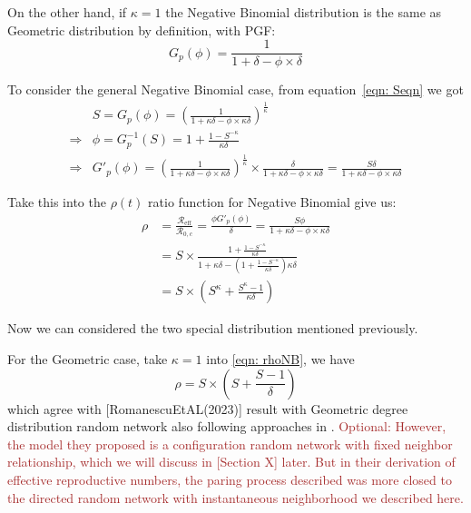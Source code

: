 \documentclass[12pt]{article}
\theoremstyle{plain}
\theoremstyle{definition}
\begin{document}
On the other hand, if $\kappa=1$ the Negative Binomial distribution is the same as Geometric distribution by definition, with PGF: 
\begin{equation}
	G_p(\phi)=\frac{1}{1+\delta-\phi\times\delta}
\end{equation}

To consider the general Negative Binomial case, from equation~\eqref{eqn: Seqn} we got
\begin{equation}
	\begin{aligned}
		&S=G_p(\phi)=(\frac{1}{1+\kappa\delta-\phi\times\kappa\delta})^{\frac{1}{\kappa}}
		\\
		\Rightarrow & \phi=G^{-1}_p(S)=1+\frac{1-S^{-\kappa}}{\kappa\delta}
		\\
		\Rightarrow & G'_p(\phi)=(\frac{1}{1+\kappa\delta-\phi\times\kappa\delta})^{\frac{1}{\kappa}}\times\frac{\delta}{1+\kappa\delta-\phi\times\kappa\delta}=\frac{S\delta}{1+\kappa\delta-\phi\times\kappa\delta}
	\end{aligned}
\end{equation}

Take this into the $\rho(t)$ ratio function for Negative Binomial give us:
\begin{equation}
	\label{eqn: rhoNB}
	\begin{aligned}
		\rho&=\frac{\mathcal{R}_{\text{eff}}}{\mathcal{R}_{0,c}}=\frac{\phi G'_p(\phi)}{\delta}=\frac{S\phi}{1+\kappa\delta-\phi\times\kappa\delta}
		\\
		&=S\times \frac{1+\frac{1-S^{-\kappa}}{\kappa\delta}}{1+\kappa\delta-(1+\frac{1-S^{-\kappa}}{\kappa\delta})\kappa\delta}
		\\
		&=S\times(S^{\kappa}+\frac{S^{\kappa}-1}{\kappa\delta})
	\end{aligned}
\end{equation}

Now we can considered the two special distribution mentioned previously.

For the Geometric case, take $\kappa=1$ into \eqref{eqn: rhoNB}, we have 
\begin{equation}
	\rho=S\times(S+\frac{S-1}{\delta})
\end{equation} which agree with [RomanescuEtAL(2023)] result with Geometric degree distribution random network also following approaches in \cite{MillerSlimVolz:2012}.
\textcolor{brown}{Optional: However, the model they proposed is a configuration random network with fixed neighbor relationship, which we will discuss in [Section X] later. 
But in their derivation of effective reproductive numbers, the paring process described was more closed to the directed random network with instantaneous neighborhood we described here.   
}
\end{document}
